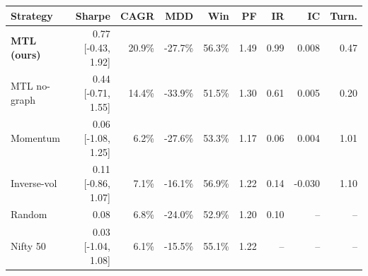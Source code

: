 \begin{tabular}{lrrrrrrrr}
\toprule
Strategy & Sharpe & CAGR & MDD & Win & PF & IR & IC & Turn. \\
\midrule
\textbf{MTL (ours)} & 0.77 {\scriptsize[-0.43, 1.92]} & 20.9\% & -27.7\% & 56.3\% & 1.49 & 0.99 & 0.008 & 0.47 \\
MTL no-graph & 0.44 {\scriptsize[-0.71, 1.55]} & 14.4\% & -33.9\% & 51.5\% & 1.30 & 0.61 & 0.005 & 0.20 \\
Momentum & 0.06 {\scriptsize[-1.08, 1.25]} & 6.2\% & -27.6\% & 53.3\% & 1.17 & 0.06 & 0.004 & 1.01 \\
Inverse-vol & 0.11 {\scriptsize[-0.86, 1.07]} & 7.1\% & -16.1\% & 56.9\% & 1.22 & 0.14 & -0.030 & 1.10 \\
Random & 0.08 & 6.8\% & -24.0\% & 52.9\% & 1.20 & 0.10 & -- & -- \\
Nifty 50 & 0.03 {\scriptsize[-1.04, 1.08]} & 6.1\% & -15.5\% & 55.1\% & 1.22 & -- & -- & -- \\
\bottomrule
\end{tabular}
